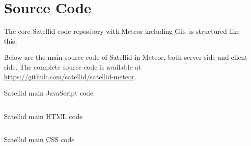 \chapter{Source Code}
\label{apx:source-code}

The core Satellid code repository with Meteor including Git, is structured like this:


\noindent Below are the main source code of Satellid in Meteor, both server side and client side.
The complete source code is available at \url{https://github.com/satellid/satellid-meteor}.

\begin{listing}[htbp]
  \caption{Satellid main JavaScript code}
  \inputminted{javascript}{\dir/code/app.js}
  \label{lst:satellid-code-js}
\end{listing}

\begin{listing}[htbp]
  \caption{Satellid main HTML code}
  \inputminted{html}{\dir/code/app.html}
  \label{lst:satellid-code-html}
\end{listing}

\begin{listing}[htbp]
  \caption{Satellid main CSS code}
  \inputminted{css}{\dir/code/app.css}
  \label{lst:satellid-code-css}
\end{listing}

